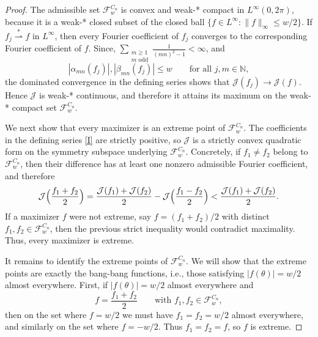 \documentclass[11pt,letterpaper,reqno]{amsart}
\begin{document}
\begin{proof}
The admissible set $\mathcal F_w^{C_n}$ is convex and weak-* compact in $L^\infty(0,2\pi)$, because it is a weak-* closed subset of the closed ball $\{f\in L^\infty:\|f\|_\infty\le w/2\}$. If $f_j\stackrel{*}{\rightharpoonup}f$ in $L^\infty$, then every Fourier coefficient of $f_j$ converges to the corresponding Fourier coefficient of $f$. Since, $\sum_{\substack{m\ge1\\m\text{ odd}}}\frac{1}{(mn)^2-1}<\infty$, and
\[
|\alpha_{mn}(f_j)|,|\beta_{mn}(f_j)|\le w
\qquad\text{for all }j,m \in \mathbb{N},
\]
the dominated convergence in the defining series shows that $\mathcal J(f_j)\to \mathcal J(f)$. Hence $\mathcal J$ is weak-* continuous, and therefore it attains its maximum on the weak-* compact set $\mathcal F_w^{C_n}$.

We next show that every maximizer is an extreme point of $\mathcal F_w^{C_n}$. The coefficients in the defining series \eqref{I} are strictly positive, so $\mathcal J$ is a strictly convex quadratic form on the symmetry subspace underlying $\mathcal F_w^{C_n}$. Concretely, if $f_1\neq f_2$ belong to $\mathcal F_w^{C_n}$, then their difference has at least one nonzero admissible Fourier coefficient, and therefore
\[
\mathcal J\Bigl(\frac{f_1+f_2}{2}\Bigr)
=
\frac{\mathcal J(f_1)+\mathcal J(f_2)}{2}
-
\mathcal J\Bigl(\frac{f_1-f_2}{2}\Bigr)
<
\frac{\mathcal J(f_1)+\mathcal J(f_2)}{2}.
\]
If a maximizer $f$ were not extreme, say $f=(f_1+f_2)/2$ with distinct $f_1,f_2\in\mathcal F_w^{C_n}$, then the previous strict inequality would contradict maximality. 
Thus, every maximizer is extreme.

It remains to identify the extreme points of $\mathcal F_w^{C_n}$. We will show that the extreme points are exactly the bang-bang functions, i.e., those satisfying $|f(\theta)|=w/2$ almost everywhere.
First, if $|f(\theta)|=w/2$ almost everywhere and
\[
f=\frac{f_1+f_2}{2}
\qquad\text{with }f_1,f_2\in\mathcal F_w^{C_n},
\]
then on the set where $f=w/2$ we must have $f_1=f_2=w/2$ almost everywhere, and similarly on the set where $f=-w/2$. Thus $f_1=f_2=f$, so $f$ is extreme.


\end{proof}
\end{document}
